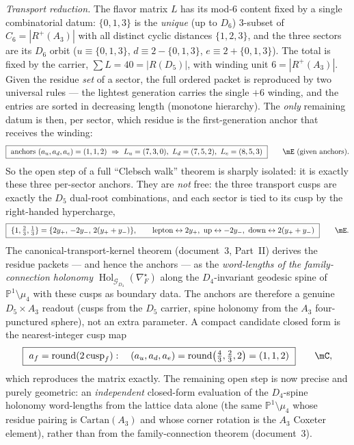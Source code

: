 \noindent\emph{Transport reduction.} The flavor matrix $L$ has its mod-$6$ content fixed by a single
combinatorial datum: $\{0,1,3\}$ is the \emph{unique} (up to $D_6$) $3$-subset of $C_6=|R^+(A_3)|$ with
all distinct cyclic distances $\{1,2,3\}$, and the three sectors are its $D_6$ orbit
($u\!\equiv\!\{0,1,3\}$, $d\!\equiv\!2{-}\{0,1,3\}$, $e\!\equiv\!2{+}\{0,1,3\}$). The total is fixed by
the carrier, $\sum L=40=|R(D_5)|$, with winding unit $6=|R^+(A_3)|$. Given the residue \emph{set} of a
sector, the full ordered packet is reproduced by two universal rules --- the lightest generation
carries the single $+6$ winding, and the entries are sorted in decreasing length (monotone hierarchy).
The \emph{only} remaining datum is then, per sector, which residue is the first-generation anchor that
receives the winding:
\begin{equation}
  \boxed{\ \text{anchors}\ (a_u,a_d,a_e)=(1,1,2)\ \Rightarrow\
  L_u=(7,3,0),\ L_d=(7,5,2),\ L_e=(8,5,3)\ }\qquad\mE\ (\text{given anchors}) .
\end{equation}
So the open step of a full ``Clebsch walk'' theorem is sharply isolated: it is exactly these three
per-sector anchors. They are \emph{not} free: the three transport cusps are exactly the $D_5$
dual-root combinations, and each sector is tied to its cusp by the right-handed hypercharge,
\begin{equation}
  \boxed{\ \{1,\tfrac23,\tfrac13\}=\{2y_+,\,-2y_-,\,2(y_++y_-)\},\qquad
  \text{lepton}\leftrightarrow 2y_+,\ \text{up}\leftrightarrow -2y_-,\ \text{down}\leftrightarrow 2(y_++y_-)\ }\qquad\mE .
\end{equation}
The canonical-transport-kernel theorem (document~3, Part~II) derives the residue packets --- and hence the anchors ---
as the \emph{word-lengths of the family-connection holonomy} $\operatorname{Hol}_{\mathcal G_{D_4}}(\nabla_F^\star)$
along the $D_4$-invariant geodesic spine of $\mathbb P^1\setminus\mu_4$ with these cusps as boundary
data. The anchors are therefore a genuine $D_5\times A_3$ readout (cusps from the $D_5$ carrier, spine
holonomy from the $A_3$ four-punctured sphere), not an extra parameter. A compact candidate closed form
is the nearest-integer cusp map
\begin{equation}
  \boxed{\ a_f=\operatorname{round}(2\,\mathrm{cusp}_f):\quad (a_u,a_d,a_e)=\operatorname{round}\bigl(\tfrac43,\tfrac23,2\bigr)=(1,1,2)\ }\qquad\mC ,
\end{equation}
which reproduces the matrix exactly. The remaining open step is now precise and purely geometric:
an \emph{independent} closed-form evaluation of the $D_4$-spine holonomy word-lengths from the lattice
data alone (the same $\mathbb P^1\setminus\mu_4$ whose residue pairing is $\mathrm{Cartan}(A_3)$ and
whose corner rotation is the $A_3$ Coxeter element), rather than from the family-connection
theorem (document~3).

